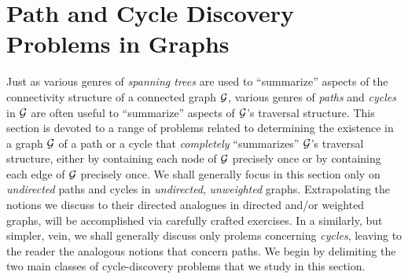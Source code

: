 \bigskip

\noindent {}


\section{Path and Cycle Discovery Problems in Graphs}
\label{sec:path-cycle-problems}

Just as various genres of {\it spanning trees} are used to
``summarize'' aspects of the connectivity structure of a connected
graph $\mbox{$\cal G$}$, various genres of {\it paths} and {\it cycles} in $\mbox{$\cal G$}$ are
often useful to ``summarize'' aspects of $\mbox{$\cal G$}$'s traversal structure.
This section is devoted to a range of problems related to determining
the existence in a graph $\mbox{$\cal G$}$ of a path or a cycle that {\em
  completely} ``summarizes'' $\mbox{$\cal G$}$'s traversal structure, either by
containing each node of $\mbox{$\cal G$}$ precisely once or by containing each edge
of $\mbox{$\cal G$}$ precisely once.  We shall generally focus in this section only
on {\em undirected} paths and cycles in {\em undirected}, {\em
  unweighted} graphs.  Extrapolating the notions we discuss to their
directed analogues in directed and/or weighted graphs, will be
accomplished via carefully crafted exercises.  In a similarly, but
simpler, vein, we shall generally discuss only prolems concerning {\em
  cycles}, leaving to the reader the analogous notions that concern
paths.  We begin by delimiting the two main classes of cycle-discovery
problems that we study in this section.

